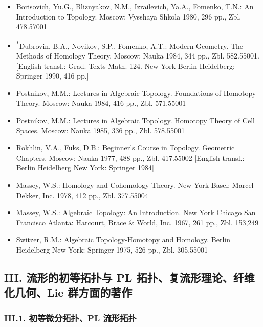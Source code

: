 \begin{itemize}
\item Borisovich, Yu.G., Bliznyakov, N.M., Izrailevich, Ya.A., Fomenko, T.N.: An Introduction to Topology. Moscow: Vysshaya Shkola 1980, 296 pp., Zbl. 478.57001
\item \textsuperscript{*}Dubrovin, B.A., Novikov, S.P., Fomenko, A.T.: Modern Geometry. The Methods of Homology Theory. Moscow: Nauka 1984, 344 pp., Zbl. 582.55001. [English transl.: Grad. Texts Math. 124. New York Berlin Heidelberg: Springer 1990, 416 pp.]
\item Postnikov, M.M.: Lectures in Algebraic Topology. Foundations of Homotopy Theory. Moscow: Nauka 1984, 416 pp., Zbl. 571.55001
\item Postnikov, M.M.: Lectures in Algebraic Topology. Homotopy Theory of Cell Spaces. Moscow: Nauka 1985, 336 pp., Zbl. 578.55001
\item Rokhlin, V.A., Fuks, D.B.: Beginner's Course in Topology. Geometric Chapters. Moscow: Nauka 1977, 488 pp., Zbl. 417.55002 [English transl.: Berlin Heidelberg New York: Springer 1984]
\item Massey, W.S.: Homology and Cohomology Theory. New York Basel: Marcel Dekker, Inc. 1978, 412 pp., Zbl. 377.55004
\item Massey, W.S.: Algebraic Topology: An Introduction. New York Chicago San Francisco Atlanta: Harcourt, Brace \& World, Inc. 1967, 261 pp., Zbl. 153,249
\item Switzer, R.M.: Algebraic Topology-Homotopy and Homology. Berlin Heidelberg New York: Springer 1975, 526 pp., Zbl. 305.55001
\end{itemize}


\subsection*{III. 流形的初等拓扑与 PL 拓扑、复流形理论、纤维化几何、Lie 群方面的著作}

\subsubsection*{III.1. 初等微分拓扑、PL 流形拓扑}

